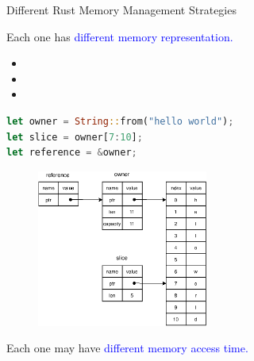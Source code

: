 \documentclass[9pt]{beamer}
\begin{document}
\begin{frame}[fragile]{Different Rust Memory Management Strategies}

    Each one has \textcolor{blue}{different memory representation.}

\begin{minipage}{0.3\linewidth}
\centering
\begin{itemize}
\item {} 
\item {}
\item {}
\end{itemize}
\end{minipage}\hfill
\begin{minipage}{0.6\linewidth}
\centering
\begin{lstlisting}[language=Rust]
let owner = String::from("hello world");
let slice = owner[7:10];
let reference = &owner;
\end{lstlisting}
\end{minipage}     

    \begin{minipage}{1.0\linewidth}
        \begin{figure}[hp]
            \centering
            \begin{center}
                    \includegraphics[width=0.5\textwidth]{images/own_ref_slice.eps}
                    \captionsetup{labelformat=empty}
            \end{center}
        \end{figure}
    \end{minipage}      
    
    Each one may have \textcolor{blue}{different memory access time.}
\end{frame}
\end{document}
